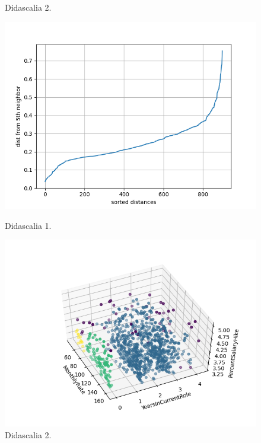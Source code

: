 \documentclass[english]{article}
\begin{document}
\begin{figure}[H]
\begin{minipage}[b]{0.45\textwidth}
\caption{Didascalia 2.}
\label{etichetta2}
\end{minipage}
\end{figure}

\begin{figure}[H]
\begin{minipage}[b]{0.45\textwidth}
\centering
\includegraphics[width=\textwidth]{./Figure/Cluster/dbscan/6/elbow.png}
\caption{Didascalia 1.}
\label{etichetta1}
\end{minipage}
\hfill
\begin{minipage}[b]{0.45\textwidth}
\centering
\includegraphics[width=\textwidth]{./Figure/Cluster/dbscan/6/Figure_6.png}
\caption{Didascalia 2.}
\label{etichetta2}
\end{minipage}
\end{figure}
\end{document}
